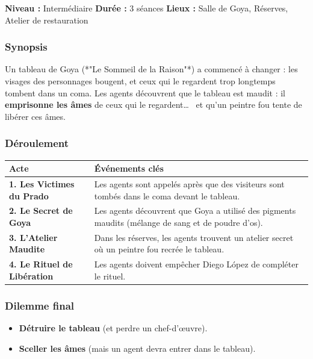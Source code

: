 \documentclass[10pt,a5paper,twoside]{book}
\begin{document}
\begin{shaded}
	\textbf{Niveau :} Intermédiaire \quad
	\textbf{Durée :} 3 séances \quad
	\textbf{Lieux :} Salle de Goya, Réserves, Atelier de restauration
\end{shaded}

\subsubsection*{Synopsis}
Un tableau de Goya (*"Le Sommeil de la Raison"*) a commencé à changer : les visages des personnages bougent, et ceux qui le regardent trop longtemps tombent dans un coma. Les agents découvrent que le tableau est maudit : il \textbf{emprisonne les âmes} de ceux qui le regardent\ldots~  et qu'un peintre fou tente de libérer ces âmes.

\subsubsection*{Déroulement}
\begin{center}
	\begin{tabular}{|P{3cm}|P{9cm}|}
	\hline
	\textbf{Acte} 							& \textbf{Événements clés} \\ \hline
	\textbf{1. Les Victimes du Prado} 		& Les agents sont appelés après que des visiteurs sont tombés dans le coma devant le tableau. \\ \hline
	\textbf{2. Le Secret de Goya} 			& Les agents découvrent que Goya a utilisé des pigments maudits (mélange de sang et de poudre d'os). \\ \hline
	\textbf{3. L'Atelier Maudite} 			& Dans les réserves, les agents trouvent un atelier secret où un peintre fou recrée le tableau. \\ \hline
	\textbf{4. Le Rituel de Libération} 	& Les agents doivent empêcher Diego López de compléter le rituel. \\ \hline
	\end{tabular}
\end{center}

\subsubsection*{Dilemme final}
\begin{itemize}
	\item \textbf{Détruire le tableau} (et perdre un chef-d'œuvre).
	\item \textbf{Sceller les âmes} (mais un agent devra entrer dans le tableau).
\end{itemize}
\end{document}
